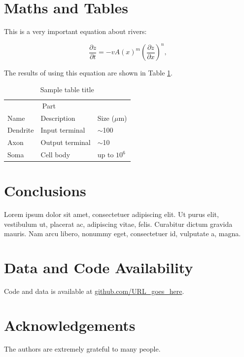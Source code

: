 \documentclass[twocolumn, switch]{article} %
\begin{document}
\section{Maths and Tables}

This is a very important equation about rivers: 

\begin{equation}
    \frac{\partial z}{\partial t} = - v A(x)^m \left(\frac{\partial z}{\partial x} \right)^n,
    \label{eq:SPL}
\end{equation}

The results of using this equation are shown in Table \ref{tab:table}. 

\begin{table}[H]
 \caption{Sample table title}
  \centering
  \begin{tabular}{lll}
    \toprule
    \multicolumn{2}{c}{Part}                   \\
    \cmidrule(r){1-2}
    Name     & Description     & Size ($\mu$m) \\
    \midrule
    Dendrite & Input terminal  & $\sim$100     \\
    Axon     & Output terminal & $\sim$10      \\
    Soma     & Cell body       & up to $10^6$  \\
    \bottomrule
  \end{tabular}
  \label{tab:table}
\end{table}

\section{Conclusions}

Lorem ipsum dolor sit amet, consectetuer adipiscing elit. Ut purus elit, vestibulum ut, placerat ac, adipiscing vitae, felis. Curabitur dictum gravida mauris. Nam arcu libero, nonummy eget, consectetuer id, vulputate a, magna.

\footnotesize
\section*{Data and Code Availability}
Code and data is available at \url{github.com/URL_goes_here}. 

\footnotesize
\section*{Acknowledgements}
The authors are extremely grateful to many people.
\end{document}
